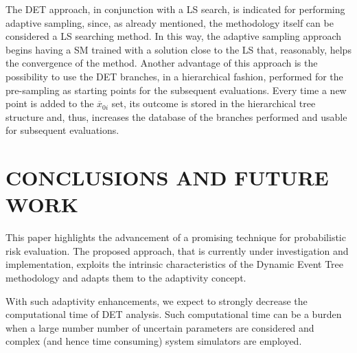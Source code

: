 \documentclass{anstrans}
\begin{document}
The DET approach, in conjunction with a LS search, is indicated for performing adaptive sampling, since, as already mentioned, the methodology itself can be considered a LS searching method. In this way, the adaptive sampling approach begins having a SM trained with a solution close to the LS that, reasonably, helps the convergence of the method.
Another advantage of this approach is the possibility to use the DET branches, in a hierarchical fashion, performed for the pre-sampling as starting points for the subsequent evaluations. Every time a new point is added to the  $\overline{x}_{0i}$ set, its outcome is stored in the hierarchical tree structure and, thus, increases the database of the branches performed and usable for subsequent evaluations.
\section{CONCLUSIONS AND FUTURE WORK}
This paper highlights the advancement of a promising technique for probabilistic risk evaluation. The proposed approach, that is currently under investigation and implementation, exploits the intrinsic characteristics of the Dynamic Event Tree methodology and adapts them to the adaptivity concept.

With such adaptivity enhancements, we expect to strongly decrease the computational time of DET analysis. Such computational time can be a burden when a large number number of uncertain parameters are considered and complex (and hence time consuming) system simulators are employed.




\end{document}
